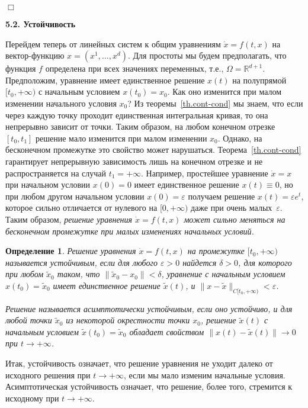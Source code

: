 \documentclass[12pt,a4paper]{article}
\newtheorem{defi}{Определение}
\newcommand{\re}{{\mathbb R}}
\begin{document}
   {\hfill $\Box$}
\bigskip

\begin{center}
\textbf{5.2. Устойчивость}
\end{center}

\bigskip

Перейдем теперь от линейных систем к общим уравнениям $\dot x = f(t, x)$ на вектор-функцию $x = (x^1, \ldots , x^d)$.
Для простоты мы будем предполагать, что функция $f$ определена при всех значениях переменных,
т.е., $\Omega = \re^{d+1}$. Предположим, уравнение имеет единственное решение
$x(t)$ на полупрямой $[t_0, + \infty)$ с начальным условием $x(t_0) = x_0$. Как оно изменится при
малом изменении начального условия $x_0$? Из теоремы~\ref{th.cont-cond}
мы знаем, что если через каждую точку проходит единственная интегральная кривая, то она непрерывно зависит
от точки. Таким образом, на любом конечном отрезке $[t_0, t_1]$ решение мало изменится
при малом изменении $x_0$. Однако, на бесконечном промежутке это свойство может нарушаться.
Теорема~\ref{th.cont-cond} гарантирует непрерывную зависимость лишь на конечном отрезке и не распространяется на случай $t_1 = +\infty$. Например, простейшее уравнение $\dot x = x$ при начальном условии $x(0) = 0$ имеет
единственное решение $x(t)\equiv 0$, но при любом другом начальном условии $x(0) = \varepsilon$ получаем решение
$x(t) = \varepsilon e^t$, которое сильно отличается от нулевого на $[0, +\infty)$ даже при очень малых~$\varepsilon$.
Таким образом, {\em решение уравнения $\dot x = f(t, x)$ может сильно меняться на бесконечном промежутке при малых
изменениях начальных условий.}
\begin{defi}\label{d.stab}
Решение уравнения $\dot x = f(t, x)$
на промежутке $[t_0, +\infty)$ называется устойчивым, если для
любого $\varepsilon > 0$ найдется $\delta > 0$, для которого при любом $\tilde x_0$ таком, что
$\|\tilde x_0 - x_0\| < \delta$,  уравнение с начальным условием $x(t_0) = \tilde x_0$
имеет единственное решение $\tilde x(t)$,  и $\|x - \tilde x\|_{C[t_0, +\infty)} < \varepsilon$.

 Решение называется асимптотически устойчивым, если оно устойчиво,  и
для любой точки $\tilde x_0$ из некоторой окрестности точки $x_0$,
решение $\tilde x(t)$  с начальным условием $\tilde x(t_0) = \tilde x_0$ обладает свойством
  $\|x(t) - \tilde x (t)\| \to 0$ при $t \to +\infty$.
\end{defi}
Итак, устойчивость означает, что решение уравнения не уходит далеко от исходного решения при $t \to +\infty$, если мы мало изменим начальные условия. Асимптотическая устойчивость означает, что решение, более того, стремится к исходному  при $t \to +\infty$.
\end{document}
